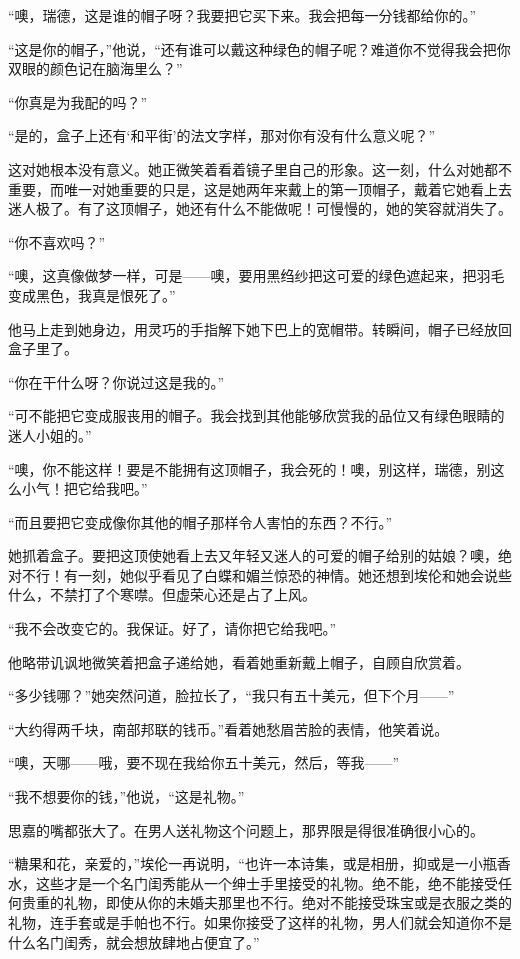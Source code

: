 \par “噢，瑞德，这是谁的帽子呀？我要把它买下来。我会把每一分钱都给你的。”
\par “这是你的帽子，”他说，“还有谁可以戴这种绿色的帽子呢？难道你不觉得我会把你双眼的颜色记在脑海里么？”
\par “你真是为我配的吗？”
\par “是的，盒子上还有‘和平街’的法文字样，那对你有没有什么意义呢？”
\par 这对她根本没有意义。她正微笑着看着镜子里自己的形象。这一刻，什么对她都不重要，而唯一对她重要的只是，这是她两年来戴上的第一顶帽子，戴着它她看上去迷人极了。有了这顶帽子，她还有什么不能做呢！可慢慢的，她的笑容就消失了。
\par “你不喜欢吗？”
\par “噢，这真像做梦一样，可是——噢，要用黑绉纱把这可爱的绿色遮起来，把羽毛变成黑色，我真是恨死了。”
\par 他马上走到她身边，用灵巧的手指解下她下巴上的宽帽带。转瞬间，帽子已经放回盒子里了。
\par “你在干什么呀？你说过这是我的。”
\par “可不能把它变成服丧用的帽子。我会找到其他能够欣赏我的品位又有绿色眼睛的迷人小姐的。”
\par “噢，你不能这样！要是不能拥有这顶帽子，我会死的！噢，别这样，瑞德，别这么小气！把它给我吧。”
\par “而且要把它变成像你其他的帽子那样令人害怕的东西？不行。”
\par 她抓着盒子。要把这顶使她看上去又年轻又迷人的可爱的帽子给别的姑娘？噢，绝对不行！有一刻，她似乎看见了白蝶和媚兰惊恐的神情。她还想到埃伦和她会说些什么，不禁打了个寒噤。但虚荣心还是占了上风。
\par “我不会改变它的。我保证。好了，请你把它给我吧。”
\par 他略带讥讽地微笑着把盒子递给她，看着她重新戴上帽子，自顾自欣赏着。
\par “多少钱哪？”她突然问道，脸拉长了，“我只有五十美元，但下个月——”
\par “大约得两千块，南部邦联的钱币。”看着她愁眉苦脸的表情，他笑着说。
\par “噢，天哪——哦，要不现在我给你五十美元，然后，等我——”
\par “我不想要你的钱，”他说，“这是礼物。”
\par 思嘉的嘴都张大了。在男人送礼物这个问题上，那界限是得很准确很小心的。
\par “糖果和花，亲爱的，”埃伦一再说明，“也许一本诗集，或是相册，抑或是一小瓶香水，这些才是一个名门闺秀能从一个绅士手里接受的礼物。绝不能，绝不能接受任何贵重的礼物，即使从你的未婚夫那里也不行。绝对不能接受珠宝或是衣服之类的礼物，连手套或是手帕也不行。如果你接受了这样的礼物，男人们就会知道你不是什么名门闺秀，就会想放肆地占便宜了。”
